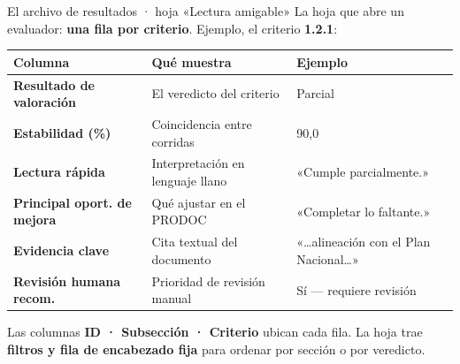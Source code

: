 \documentclass[aspectratio=169,11pt]{beamer}
\newcommand{\bluelead}[1]{\textbf{\color{iloBlue}#1}}
\begin{document}
\begin{frame}{El archivo de resultados · hoja «Lectura amigable»}
  \small
  La hoja que abre un evaluador: \bluelead{una fila por criterio}. Ejemplo, el criterio \bluelead{1.2.1}:
  \vspace{0.15cm}
  \renewcommand{\arraystretch}{1.15}
  \begin{tabular}{@{}p{3.6cm}p{4.0cm}p{4.2cm}@{}}
    \toprule
    \rowcolor{iloBlue}\color{white}\textbf{Columna} & \color{white}\textbf{Qué muestra} & \color{white}\textbf{Ejemplo}\\
    \midrule
    \bluelead{Resultado de valoración} & El veredicto del criterio & Parcial\\
    \rowcolor{iloGrayLt}\bluelead{Estabilidad (\%)} & Coincidencia entre corridas & 90,0\\
    \bluelead{Lectura rápida} & Interpretación en lenguaje llano & «Cumple parcialmente.»\\
    \rowcolor{iloGrayLt}\bluelead{Principal oport. de mejora} & Qué ajustar en el PRODOC & «Completar lo faltante.»\\
    \bluelead{Evidencia clave} & Cita textual del documento & «…alineación con el Plan Nacional…»\\
    \rowcolor{iloGrayLt}\bluelead{Revisión humana recom.} & Prioridad de revisión manual & Sí — requiere revisión\\
    \bottomrule
  \end{tabular}
  \vspace{0.2cm}\par
  {\footnotesize Las columnas \textbf{ID · Subsección · Criterio} ubican cada fila. La hoja trae \bluelead{filtros y fila de encabezado fija} para ordenar por sección o por veredicto.}
\end{frame}
\end{document}
